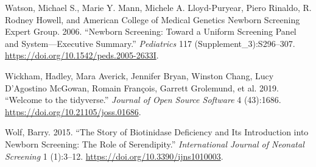 \documentclass[review]{elsarticle}
\begin{document}
\begin{hangparas}{1.5em}{1}
\hypertarget{citeproc_bib_item_8}{Watson, Michael S., Marie Y. Mann, Michele A. Lloyd-Puryear, Piero Rinaldo, R. Rodney Howell, and American College of Medical Genetics Newborn Screening Expert Group. 2006. “Newborn Screening: Toward a Uniform Screening Panel and System—Executive Summary.” \textit{Pediatrics} 117 (Supplement\_3):S296–307. \href{https://doi.org/10.1542/peds.2005-2633I}{https://doi.org/10.1542/peds.2005-2633I}.}

\hypertarget{citeproc_bib_item_9}{Wickham, Hadley, Mara Averick, Jennifer Bryan, Winston Chang, Lucy D’Agostino McGowan, Romain François, Garrett Grolemund, et al. 2019. “Welcome to the tidyverse.” \textit{Journal of Open Source Software} 4 (43):1686. \href{https://doi.org/10.21105/joss.01686}{https://doi.org/10.21105/joss.01686}.}

\hypertarget{citeproc_bib_item_10}{Wolf, Barry. 2015. “The Story of Biotinidase Deficiency and Its Introduction into Newborn Screening: The Role of Serendipity.” \textit{International Journal of Neonatal Screening} 1 (1):3–12. \href{https://doi.org/10.3390/ijns1010003}{https://doi.org/10.3390/ijns1010003}.}
\end{hangparas}
\end{document}
